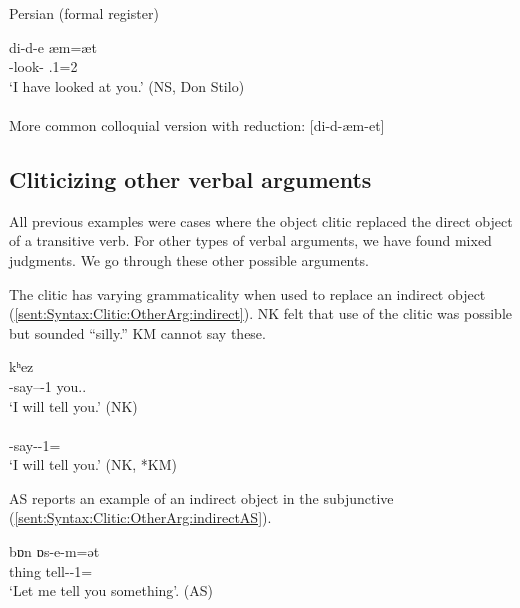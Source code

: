 \begin{exe}
	\ex Persian   (formal register)
	
	 \gll di-d-e æm=æt  \\
	 {\impf}-look-{\ptcp} {\auxgloss}.1{\sg}=2{\sg} \\
	 \trans `I have looked at you.' \hfill (NS, Don Stilo) \label{sent:Syntax:Clitic:OtherTense:stilo}\\
\\ 
More common colloquial version with reduction: [di-d-æm-et]
%	 
\end{exe}


 

\subsection{Cliticizing other verbal arguments }\label{section:syntax:clitic:otherArgu}
All previous examples were cases where the object clitic replaced the direct object of a transitive verb. For other types of verbal arguments, we have found mixed judgments. We go through these other possible arguments.


The clitic has varying grammaticality when used to replace an indirect object (\ref{sent:Syntax:Clitic:OtherArg:indirect}). NK felt that use of the clitic was possible but sounded  ``silly.''  KM cannot say these.


\begin{exe}
	\ex\label{sent:Syntax:Clitic:OtherArg:indirect}
	\begin{xlist}
		\ex {}  {kʰez}   
		\\
		{\fut}-say--{\thgloss}-1{\sg} you.{\sg}.{\dat}
		\\
		\trans	`I will tell you.' \hfill (NK)
		\\
		\ex {}
		\\
		{\fut}-say-{\thgloss}-1{\sg}={\possSsg}
		\\
		\trans	`I will tell you.' \hfill   (NK,  *KM)
		\\
		
	\end{xlist}
\end{exe}

AS reports an example of an indirect object in the subjunctive (\ref{sent:Syntax:Clitic:OtherArg:indirectAS}).

\begin{exe}
	\ex {} {bɒn} {ɒs-e-m=ət }
	\\
	{\indf} thing tell-{\thgloss}-1{\sg}={\possSsg}
	\\
	\trans	`Let me tell you something'. \hfill  (AS)\label{sent:Syntax:Clitic:OtherArg:indirectAS}
	\\
\end{exe}

